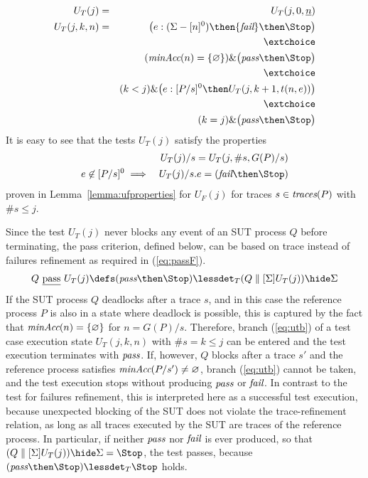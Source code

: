 \documentclass[3p,times]{elsarticle}
\newcommand{\trc}{\text{\it traces}}
\newcommand{\epass}{{\text{\it pass}}}
\newcommand{\efail}{{\text{\it fail}}}
\newcommand{\pass}{\underline{\text{pass}}}
\newcommand{\ii}[1]{\underline{#1}}
\newcommand{\minaccs}{\text{\it minAcc}}
\begin{document}
\begin{eqnarray}
U_T(j) & = & U_T(j,0,\ii n)
\\
U_T(j,k,n) & = & \big(  e:(\Sigma - [n]^0)   \then \efail\then \Stop \big)
\label{eq:uta}
\\ & & \extchoice \nonumber
\\ & & (\minaccs(n) = \{ \varnothing \})   \&   \big( \epass \then \Stop \big)
\label{eq:utb}
\\ & & \extchoice \nonumber
\\ & & (k < j) \& \big( e:[P/s]^0   \then U_T(j,k+1,t(n,e)) \big)
\label{eq:utc}
\\ & & \extchoice \nonumber
\\ & & (k = j) \& \big( \epass\then \Stop  \big)
\label{eq:utd}
\end{eqnarray}
%
It is easy to see that the tests $U_T(j)$ satisfy the properties
\begin{eqnarray}
\label{eq:ifpaT}
  &  & U_T(j)/s = U_T(j,\#s,G(P)/s)
\\
\label{eq:ifpbT}
e\not\in [P/s]^0 & \implies & U_T(j)/s.e = (\efail\then\Stop)
\end{eqnarray}
proven in Lemma~\ref{lemma:ufproperties} for $U_F(j)$ for traces
$s\in\trc(P)$ with $\#s \le j$.


Since the test $U_T(j)$ never blocks any event of an SUT process $Q$ before
terminating, the pass criterion, defined below, can be based on
trace instead of failures refinement as required in (\ref{eq:passF}).
%
\begin{equation}
\label{eq:passT}
Q\ \pass\ U_T(j) \defs (\epass\then\Stop) \lessdet_T (Q\parallel[\Sigma] U_T(j)) \hide \Sigma
\end{equation}
%
If the SUT process $Q$ deadlocks after a trace $s$, and in this case the
reference process $P$ is also in a state where deadlock is possible, this is
captured by the fact that $\minaccs(n) = \{ \varnothing\}$ for $n = G(P)/s$.
Therefore, branch (\ref{eq:utb}) of a test case execution state $U_T(j,k,n)$
with $\#s = k \le j$   can be entered and the  test execution terminates with
$\epass$. If, however, $Q$ blocks after a trace $s'$ and the reference
process satisfies $\minaccs(P/s') \neq\varnothing$, branch (\ref{eq:utb})
cannot be taken, and the test execution stops without producing $\epass$ or
$\efail$. In contrast to the test for failures refinement, this is
interpreted here as a successful test execution, because unexpected blocking
of the SUT does not violate the trace-refinement relation, as long as all
traces executed by the SUT are traces of the reference process. In
particular, if neither $\epass$ nor $\efail$ is ever produced, so that
$(Q\parallel[\Sigma] U_T(j)) \hide \Sigma = \Stop$, the test passes, because
$(\epass\then\Stop) \lessdet_T \Stop$ holds.
\end{document}
